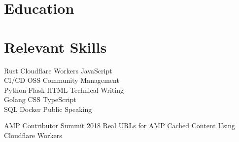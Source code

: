 \documentclass[]{deedy-resume-openfont}
\begin{document}
\section{Education}
\sectionsep

\section{Relevant Skills}
\begin{minipage}[t]{.5\textwidth}
\descript{}
Rust \textbullet{} Cloudflare Workers \textbullet{} JavaScript \\ CI/CD \textbullet{} OSS Community Management \\ Python \textbullet{} Flask \textbullet{} HTML \textbullet{} Technical Writing \\
\sectionsep
{}\descript{}
Golang \textbullet{} CSS \textbullet{} TypeScript \\ SQL \textbullet{} Docker \textbullet{} Public Speaking
\sectionsep
\end{minipage}
\hfill
\begin{minipage}[t]{.49\textwidth}
\descript{}
AMP Contributor Summit 2018  
\sectionsep
{}\descript{}
Real URLs for AMP Cached Content Using Cloudflare Workers 
\sectionsep
\end{minipage}
\end{document}
